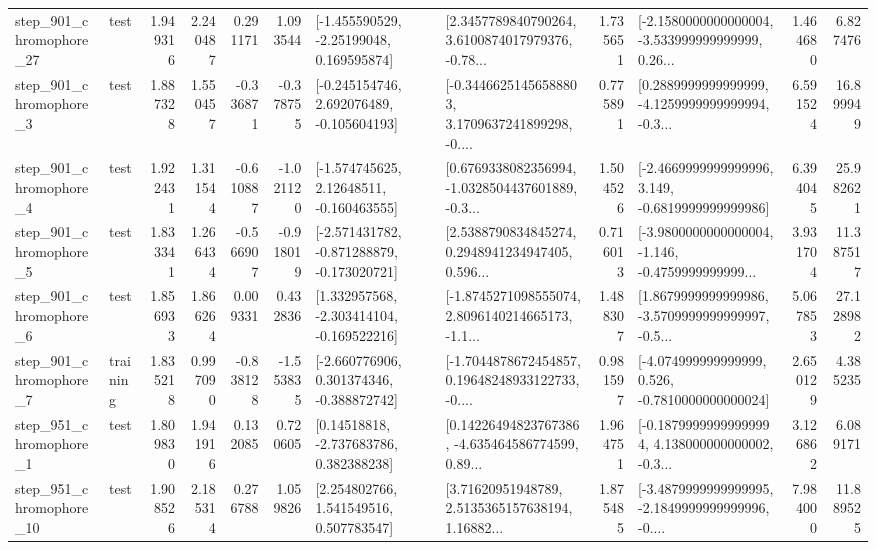 \begin{tabular}{llrrrrllrlrr}
  step\_901\_chromophore\_27 &      test &      1.949316 &    2.240487 &      0.291171 &  1.093544 &    [-1.455590529, -2.25199048, 0.169595874] &  [2.3457789840790264, 3.6100874017979376, -0.78... &       1.735651 &  [-2.1580000000000004, -3.533999999999999, 0.26... &            1.464680 &          6.827476 \\
   step\_901\_chromophore\_3 &      test &      1.887328 &    1.550457 &     -0.336871 & -0.378755 &   [-0.245154746, 2.692076489, -0.105604193] &  [-0.34466251456588803, 3.1709637241899298, -0.... &       0.775891 &  [0.2889999999999999, -4.1259999999999994, -0.3... &            6.591524 &         16.899949 \\
   step\_901\_chromophore\_4 &      test &      1.922431 &    1.311544 &     -0.610887 & -1.021120 &    [-1.574745625, 2.12648511, -0.160463555] &  [0.6769338082356994, -1.0328504437601889, -0.3... &       1.504526 &  [-2.4669999999999996, 3.149, -0.6819999999999986] &            6.394045 &         25.982621 \\
   step\_901\_chromophore\_5 &      test &      1.833341 &    1.266434 &     -0.566907 & -0.918019 &  [-2.571431782, -0.871288879, -0.173020721] &  [2.5388790834845274, 0.2948941234947405, 0.596... &       0.716013 &  [-3.9800000000000004, -1.146, -0.4759999999999... &            3.931704 &         11.387517 \\
   step\_901\_chromophore\_6 &      test &      1.856933 &    1.866264 &      0.009331 &  0.432836 &   [1.332957568, -2.303414104, -0.169522216] &  [-1.8745271098555074, 2.8096140214665173, -1.1... &       1.488307 &  [1.8679999999999986, -3.5709999999999997, -0.5... &            5.067853 &         27.128982 \\
   step\_901\_chromophore\_7 &  training &      1.835218 &    0.997090 &     -0.838128 & -1.553835 &   [-2.660776906, 0.301374346, -0.388872742] &  [-1.7044878672454857, 0.19648248933122733, -0.... &       0.981597 &   [-4.074999999999999, 0.526, -0.7810000000000024] &            2.650129 &          4.385235 \\
   step\_951\_chromophore\_1 &      test &      1.809830 &    1.941916 &      0.132085 &  0.720605 &     [0.14518818, -2.737683786, 0.382388238] &  [0.14226494823767386, -4.635464586774599, 0.89... &       1.964751 &  [-0.18799999999999994, 4.138000000000002, -0.3... &            3.126862 &          6.089171 \\
  step\_951\_chromophore\_10 &      test &      1.908526 &    2.185314 &      0.276788 &  1.059826 &     [2.254802766, 1.541549516, 0.507783547] &  [3.71620951948789, 2.5135365157638194, 1.16882... &       1.875485 &  [-3.4879999999999995, -2.1849999999999996, -0.... &            7.984000 &         11.889525 \\

\end{tabular}
